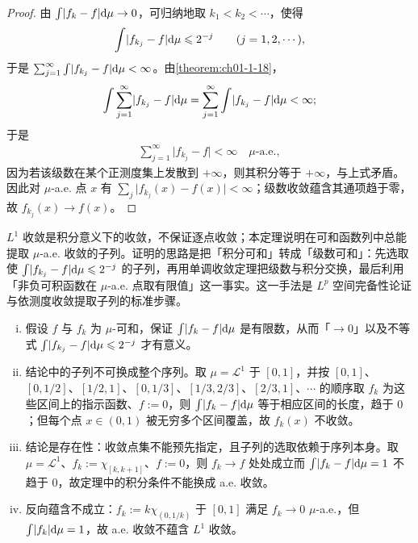 \documentclass[../../main.tex]{subfiles}%
\begin{document}
\begin{proof}
由 $\int\lvert f_k-f\rvert\mathrm{d}\mu\to0$，可归纳地取 $k_1<k_2<\cdots$，使得
\begin{align*}
\int\lvert f_{k_j}-f\rvert\mathrm{d}\mu\leqslant2^{-j}\qquad(j=1,2,\cdots),
\end{align*}
于是 $\sum_{j=1}^{\infty}\int\lvert f_{k_j}-f\rvert\mathrm{d}\mu<\infty$。由\cref{theorem:ch01-1-18}，%
\begin{align*}
\int\sum_{j=1}^{\infty}\lvert f_{k_j}-f\rvert\mathrm{d}\mu=\sum_{j=1}^{\infty}\int\lvert f_{k_j}-f\rvert\mathrm{d}\mu<\infty;
\end{align*}
于是
\begin{align*}
\sum_{j=1}^{\infty}\lvert f_{k_j}-f\rvert<\infty\quad\mu\text{-a.e.},
\end{align*}
因为若该级数在某个正测度集上发散到 $+\infty$，则其积分等于 $+\infty$，与上式矛盾。因此对 $\mu$-a.e. 点 $x$ 有 $\sum_{j}\lvert f_{k_j}(x)-f(x)\rvert<\infty$；级数收敛蕴含其通项趋于零，故 $f_{k_j}(x)\to f(x)$。
\end{proof}

\begin{remark}\label{remark:ch01-thm-1-21-动机}
$L^1$ 收敛是积分意义下的收敛，不保证逐点收敛；本定理说明在可和函数列中总能提取 $\mu$-a.e. 收敛的子列。证明的思路是把「积分可和」转成「级数可和」：先选取使 $\int\lvert f_{k_j}-f\rvert\mathrm{d}\mu\leqslant2^{-j}$ 的子列，再用单调收敛定理把级数与积分交换，最后利用「非负可积函数在 $\mu$-a.e. 点取有限值」这一事实。这一手法是 $L^p$ 空间完备性论证与依测度收敛提取子列的标准步骤。
\end{remark}

\begin{remark}\label{remark:ch01-thm-1-21-条件}
\begin{enumerate}[(i)]
\item 假设 $f$ 与 $f_k$ 为 $\mu$-可和，保证 $\int\lvert f_k-f\rvert\mathrm{d}\mu$ 是有限数，从而「$\to0$」以及不等式 $\int\lvert f_{k_j}-f\rvert\mathrm{d}\mu\leqslant2^{-j}$ 才有意义。
\item 结论中的子列不可换成整个序列。取 $\mu=\mathcal{L}^1$ 于 $[0,1]$，并按 $[0,1]$、$[0,1/2]$、$[1/2,1]$、$[0,1/3]$、$[1/3,2/3]$、$[2/3,1]$、$\cdots$ 的顺序取 $f_k$ 为这些区间上的指示函数、$f:=0$，则 $\int\lvert f_k-f\rvert\mathrm{d}\mu$ 等于相应区间的长度，趋于 $0$；但每个点 $x\in(0,1)$ 被无穷多个区间覆盖，故 $f_k(x)$ 不收敛。
\item 结论是存在性：收敛点集不能预先指定，且子列的选取依赖于序列本身。取 $\mu=\mathcal{L}^1$、$f_k:=\chi_{[k,k+1]}$、$f:=0$，则 $f_k\to f$ 处处成立而 $\int\lvert f_k-f\rvert\mathrm{d}\mu=1$ 不趋于 $0$，故定理中的积分条件不能换成 a.e. 收敛。
\item 反向蕴含不成立：$f_k:=k\chi_{(0,1/k)}$ 于 $[0,1]$ 满足 $f_k\to0$ $\mu$-a.e.，但 $\int\lvert f_k\rvert\mathrm{d}\mu=1$，故 a.e. 收敛不蕴含 $L^1$ 收敛。
\end{enumerate}
\end{remark}
\end{document}
